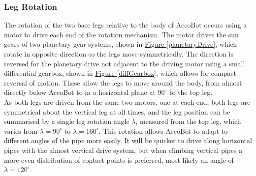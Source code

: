 \documentclass[11pt]{article}		%
\newcommand{\figref}[1]{\hyperref[#1]{Figure \ref*{#1}}}    %
\begin{document}
			\subsubsection{Leg Rotation}
				
				The rotation of the two base legs relative to the body of AccoBot occurs using a motor to drive each end of the rotation mechanism.
				The motor drives the sun gears of two planetary gear systems, shown in \figref{planetaryDrive}, which rotate in opposite direction so the legs move symmetrically.
				The direction is reversed for the planetary drive not adjacent to the driving motor using a small differential gearbox, shown in \figref{diffGearbox}, which allows for compact reversal of motion.
				These allow the legs to move around the body, from almost directly below AccoBot to in a horizontal plane at $90^\circ$ to the top leg.
				\\
				As both legs are driven from the same two motors, one at each end, both legs are symmetrical about the vertical leg at all times, and the leg position can be summarised by a single leg rotation angle $\lambda$, measured from the top leg, which varies from $\lambda = 90^\circ$ to $\lambda = 160^\circ$.
				This rotation allows AccoBot to adapt to different angles of the pipe more easily.
				It will be quicker to drive along horizontal pipes with the almost vertical drive system, but when climbing vertical pipes a more even distribution of contact points is preferred, most likely an angle of $\lambda = 120^\circ$.
										
\end{document}
